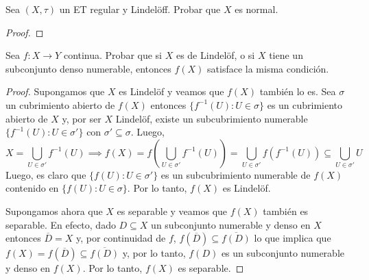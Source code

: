 \documentclass{article}
\theoremstyle{definition}
\newcommand{\cl}[1]{\overline{#1}}              %
\newenvironment{ejercicio}[1]{\begin{trivlist}
\item[\hskip \labelsep {\bfseries Ejercicio}\hskip \labelsep {\bfseries #1.}]}{\end{trivlist}}
\begin{document}
\begin{ejercicio}{C2}
    Sea \((X, \tau)\) un ET regular y Lindelöff. Probar que \(X\) es normal.
\end{ejercicio}
\begin{proof}

\end{proof}

\begin{ejercicio}{C3}
    Sea \(f : X \rightarrow Y\) continua. Probar que si \(X\) es de Lindelöf, o si \(X\) tiene un subconjunto denso numerable, entonces \(f(X)\) satisface la misma condición.
\end{ejercicio}
\begin{proof}
    Supongamos que \( X \) es Lindelöf y veamos que \( f(X) \) también lo es. Sea \( \sigma \) un cubrimiento abierto de \( f(X) \) entonces \( \{ f^{-1}(U) : U \in \sigma \} \) es un cubrimiento abierto de \( X \) y, por ser \( X \) Lindelöf, existe un subcubrimiento numerable \( \{ f^{-1}(U) : U \in \sigma' \} \) con \( \sigma' \subseteq \sigma \).
    Luego, \[
        X = \bigcup_{U \in \sigma'} f^{-1}(U) \implies f(X) = f\left( \bigcup_{U \in \sigma'} f^{-1}(U) \right) = \bigcup_{U \in \sigma'} f(f^{-1}(U)) \subseteq \bigcup_{U \in \sigma'} U
    \]
    Luego, es claro que \( \{ f(U) : U \in \sigma' \} \) es un subcubrimiento numerable de \( f(X) \) contenido en \( \{ f(U) : U \in \sigma \} \). Por lo tanto, \( f(X) \) es Lindelöf.
    
    Supongamos ahora que \( X \) es separable y veamos que \( f(X) \) también es separable.
    En efecto, dado \( D \subseteq X \) un subconjunto numerable y denso en \( X \) entonces \( \cl{D} = X \) y, por continuidad de \( f \), \( f(\cl{D}) \subseteq \cl{f(D)} \) lo que implica que \( f(X) = f(\cl{D}) \subseteq \cl{f(D)} \) y, por lo tanto, \( f(D) \) es un subconjunto numerable y denso en \( f(X) \). Por lo tanto, \( f(X) \) es separable.
\end{proof}
\end{document}
